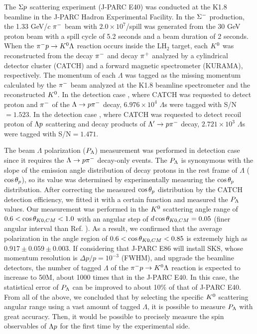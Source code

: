 The $\Sigma p$ scattering experiment (J-PARC E40) \cite{Miwa-AIP2019} \cite{Miwa-JP2020} was conducted at the K1.8 beamline in the J-PARC Hadron Experimental Facility. In the $\Sigma^{-}$ production, the 1.33 GeV/$c$ $\pi^{-}$ beam with $2.0\times10^{7}$/spill was generated from the 30 GeV proton beam with a spill cycle of 5.2 seconds and a beam duration of 2 seconds. When the $\pi^- p \to K^0 \Lambda$ reaction occurs inside the LH$_{2}$ target, each $K^{0}$ was reconstructed from the decay $\pi^{-}$ and decay $\pi^{+}$ analyzed by a cylindrical detector cluster (CATCH) and a forward magnetic spectrometer (KURAMA), respectively. The momentum of each $\Lambda$ was tagged as the missing momentum calculated by the $\pi^{-}$ beam analyzed at the K1.8 beamline spectrometer \cite{K1.8} and the reconstructed $K^{0}$. In the detection case , where CATCH was requested to detect proton and $\pi^{-}$ of the $\Lambda\to p\pi^{-}$ decay, $6.976\times10^{4}$ $\Lambda$s were tagged with S/N$=1.523$. In the detection case , where CATCH was requested to detect recoil proton of $\Lambda p$ scattering and decay products of $\Lambda'\to p\pi^{-}$ decay, $2.721\times10^{3}$ $\Lambda$s were tagged with S/N$=1.471$. 

The beam $\Lambda$ polarization ($P_{\Lambda}$) measurement was performed in detection case  since it requires the $\Lambda\to p\pi^{-}$ decay-only events. The $P_{\Lambda}$ is synonymous with the slope of the emission angle distribution of decay protons in the rest frame of $\Lambda$ ($\cos{\theta_p}$), so its value was determined by experimentally measuring the $\cos{\theta_p}$ distribution. After correcting the measured $\cos{\theta_p}$ distribution by the CATCH detection efficiency, we fitted it with a certain function and measured the $P_{\Lambda}$ values. Our measurement was performed in the $K^{0}$ scattering angle range of $0.6<\cos{\theta_{K0,CM}}<1.0$ with an angular step of $d\cos{\theta_{K0,CM}}=0.05$ (finer angular interval than Ref. \cite{Baker}). As a result, we confirmed that the average polarization in the angle region of $0.6<\cos{\theta_{K0,CM}}<0.85$ is extremely high as $0.917\pm0.059\pm0.003$. If considering that J-PARC E86 will install SKS, whose momentum resolution is $\Delta p/p = 10^{-3}$ (FWHM), and upgrade the beamline detectors, the number of tagged $\Lambda$ of the $\pi^- p \to K^0 \Lambda$ reaction is expected to increase to 50M, about 1000 times that in the J-PARC E40. In this case, the statistical error of $P_{\Lambda}$ can be improved to about 10\% of that of J-PARC E40. From all of the above, we concluded that by selecting the specific $K^{0}$ scattering angular range using a vast amount of tagged $\Lambda$, it is possible to measure $P_{\Lambda}$ with great accuracy. Then, it would be possible to precisely measure the spin observables of $\Lambda p$ for the first time by the experimental side.

